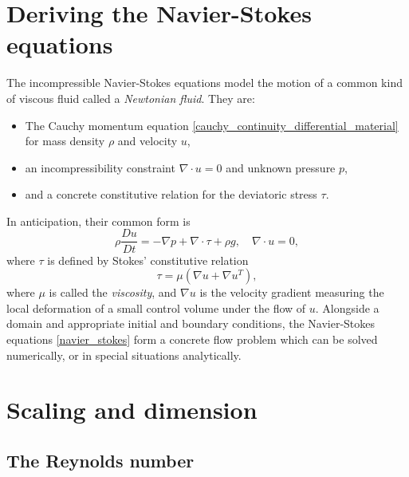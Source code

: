 \documentclass[11pt,a4paper]{memoir}
\begin{document}
\section{Deriving the Navier-Stokes equations}
The incompressible Navier-Stokes equations model the motion of a common kind of viscous fluid called a \textit{Newtonian fluid}.
They are:
\begin{itemize}
\item The Cauchy momentum equation \eqref{cauchy_continuity_differential_material} for mass density $\rho$ and velocity $u$,
\item an incompressibility constraint $\nabla\cdot u = 0$ and unknown pressure $p$,
\item and a concrete constitutive relation for the deviatoric stress $\tau$.
\end{itemize}
In anticipation, their common form is
\begin{equation}\label{navier_stokes}
    \rho\frac{Du}{Dt} = - \nabla p + \nabla\cdot\tau + \rho g,\quad \nabla\cdot u = 0,
\end{equation}
where $\tau$ is defined by Stokes' constitutive relation
\begin{equation}\label{stokes_constitutive_relation}
    \tau = \mu\left(\nabla u + \nabla u^T\right),
\end{equation}
where $\mu$ is called the \textit{viscosity}, and $\nabla u$ is the velocity gradient measuring the local deformation of a small control volume under
the flow of $u$. Alongside a domain and appropriate initial and boundary conditions, the Navier-Stokes equations \eqref{navier_stokes}
form a concrete flow problem which
can be solved numerically, or in special situations analytically.

\section{Scaling and dimension}
\subsection{The Reynolds number}
\end{document}
